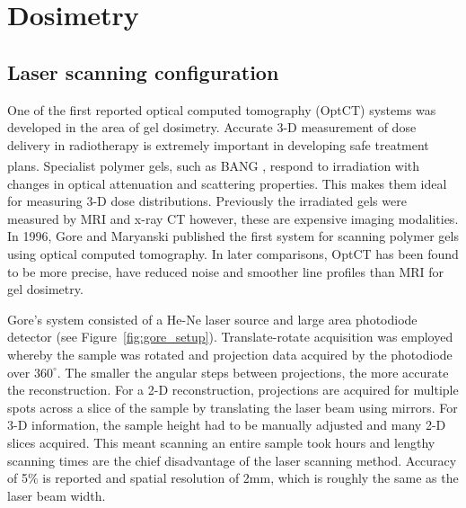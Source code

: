 \documentclass[12pt]{article}
\begin{document}

\newpage
\section{Dosimetry}
\label{sec:dos}
\subsection{Laser scanning configuration}


One of the first reported optical computed tomography (OptCT) systems was developed in the area of gel dosimetry. Accurate 3-D measurement of dose delivery in radiotherapy is extremely important in developing safe treatment plans. Specialist polymer gels, such as BANG\textsuperscript{\textregistered} \cite{Maryanski:1996}, respond to irradiation with changes in optical attenuation and scattering properties.  This makes them ideal for measuring 3-D dose distributions. Previously the irradiated gels were measured by MRI and x-ray CT however, these are expensive imaging modalities. In 1996, Gore and Maryanski published the first system for scanning polymer gels using optical computed tomography. \cite{Gore:1999tg} In later comparisons, OptCT has been found to be more precise, have reduced noise and smoother line profiles than MRI for gel dosimetry. \cite{Oldham:2001gs}

Gore's system consisted of a  He-Ne laser source and large area photodiode detector (see Figure~\ref{fig:gore_setup}). Translate-rotate acquisition was employed whereby the sample was rotated and projection data  acquired  by the photodiode over $360^{\circ}$. The smaller the angular steps between projections, the more accurate the reconstruction. \cite{russ2002image} For a 2-D reconstruction, projections are acquired for multiple spots across a slice of the sample by translating the laser beam using mirrors. For 3-D information, the sample height  had to be manually adjusted and many 2-D slices acquired. This meant scanning an entire sample took  hours and lengthy scanning times are the chief disadvantage of the laser scanning method.  Accuracy of 5\% is reported and spatial resolution of 2mm, which is roughly the same as the laser beam width. \cite{Gore:1999tg}
\end{document}
